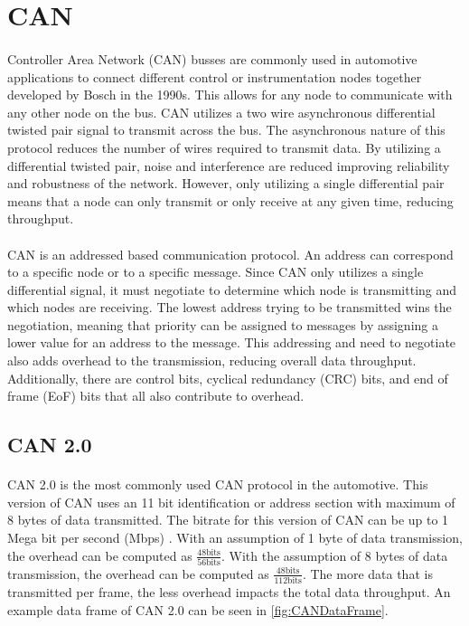 \section{CAN}

\paragraph{}
Controller Area Network (CAN) busses are commonly used in automotive applications to connect different control or instrumentation nodes together developed by Bosch in the 1990s.
This allows for any node to communicate with any other node on the bus.
CAN utilizes a two wire asynchronous differential twisted pair signal to transmit across the bus.
The asynchronous nature of this protocol reduces the number of wires required to transmit data.
By utilizing a differential twisted pair, noise and interference are reduced improving reliability and robustness of the network.
However, only utilizing a single differential pair means that a node can only transmit or only receive at any given time, reducing throughput.

\paragraph{}
CAN is an addressed based communication protocol.
An address can correspond to a specific node or to a specific message.
Since CAN only utilizes a single differential signal, it must negotiate to determine which node is transmitting and which nodes are receiving.
The lowest address trying to be transmitted wins the negotiation, meaning that priority can be assigned to messages by assigning a lower value for an address to the message.
This addressing and need to negotiate also adds overhead to the transmission, reducing overall data throughput.
Additionally, there are control bits, cyclical redundancy (CRC) bits, and end of frame (EoF) bits that all also contribute to overhead.

\subsection{CAN 2.0}

\paragraph{}
CAN 2.0 is the most commonly used CAN protocol in the automotive.
This version of CAN uses an 11 bit identification or address section with maximum of 8 bytes of data transmitted.
The bitrate for this version of CAN can be up to 1 Mega bit per second (Mbps) \cite{BOSCH_CAN20}.
With an assumption of 1 byte of data transmission, the overhead can be computed as $\frac{48 \text{bits}}{56 \text{bits}}$.  With the assumption of 8 bytes of data transmission, the overhead can be computed as $\frac{48 \text{bits}}{112 \text{bits}}$.
The more data that is transmitted per frame, the less overhead impacts the total data throughput.
An example data frame of CAN 2.0 can be seen in \cref{fig:CANDataFrame}.

